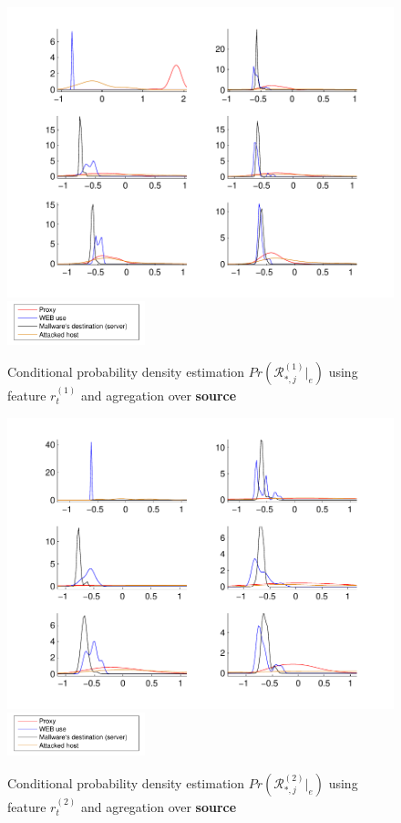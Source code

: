 \documentclass[a4paper]{IEEEtran}
\begin{document}
\begin{figure}[t!]%
  \centering
  \includegraphics[width=140mm]{dens_src_bdivp}
    \includegraphics[width=40mm]{legend}
  \caption{Conditional probability density estimation $Pr ( \mathcal{R}^{(1)}_{*,j}|_e ) $ using feature $r_t^{(1)}$ and agregation over \textbf{source}}
  \label{fig:dens_src_bdivp}
\end{figure}
\begin{figure}[t!]%
  \centering
  \includegraphics[width=140mm]{dens_src_logp}
  \includegraphics[width=40mm]{legend}
  \caption{Conditional probability density estimation $Pr ( \mathcal{R}^{(2)}_{*,j}|_e ) $ using feature $r_t^{(2)}$ and agregation over \textbf{source}}
  \label{fig:dens_src_logp}
\end{figure}
\end{document}
